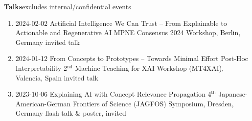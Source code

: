\headedsection
{\bf Talks}{excludes internal/confidential events}
{
\begin{enumerate}

    \item {}
                    {2024-02-02}
                    {Artificial Intelligence We Can Trust -- From Explainable to Actionable and Regenerative AI}
                    {MPNE Consensus 2024 Workshop, Berlin, Germany}
                    {invited talk}

    \item {}
                    {2024-01-12}
                    {From Concepts to Prototypes -- Towards Minimal Effort Post-Hoc Interpretability}
                    {2$^\text{nd}$ Machine Teaching for XAI Workshop (MT4XAI), Valencia, Spain}
                    {invited talk}

    \item {}
                    {2023-10-06}
                    {Explaining AI with Concept Relevance Propagation}
                    {4$^\text{th}$ Japanese-American-German Frontiers of Science (JAGFOS) Symposium, Dresden, Germany}
                    {flash talk \& poster, invited}


\end{enumerate}}
